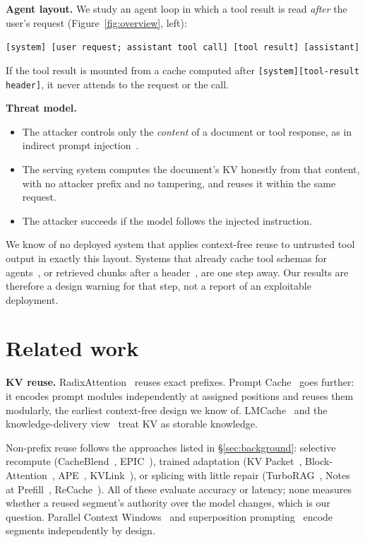 \documentclass[10pt]{article}
\begin{document}
\textbf{Agent layout.} We study an agent loop in which a tool result is read \emph{after} the user's request (Figure~\ref{fig:overview},
left):
\begin{center}\small\texttt{[system] [user request; assistant tool call] [tool result] [assistant]}\end{center}
If the tool result is mounted from a cache computed after \texttt{[system][tool-result header]}, it never attends to the request or
the call.

\textbf{Threat model.}
\begin{itemize}
\item The attacker controls only the \emph{content} of a document or tool response, as in indirect prompt
  injection~\citep{greshake2023indirect}.
\item The serving system computes the document's KV honestly from that content, with no attacker prefix and no tampering, and
  reuses it within the same request.
\item The attacker succeeds if the model follows the injected instruction.
\end{itemize}
We know of no deployed system that applies context-free reuse to untrusted tool output in exactly this layout. Systems that already
cache tool schemas for agents~\citep{fang2026recache}, or retrieved chunks after a
header~\citep{lu2025turborag,yao2025cacheblend}, are one step away. Our results are therefore a design warning for that step, not a
report of an exploitable deployment.

\section{Related work}\label{sec:related}
\textbf{KV reuse.} RadixAttention~\citep{zheng2024sglang} reuses exact prefixes. Prompt Cache~\citep{gim2024promptcache} goes
further: it encodes prompt modules independently at assigned positions and reuses them modularly, the earliest context-free design
we know of.
LMCache~\citep{liu2025lmcache} and the knowledge-delivery view~\citep{cheng2024kdn} treat KV as storable knowledge.

Non-prefix reuse follows the approaches listed in \S\ref{sec:background}: selective recompute (CacheBlend~\citep{yao2025cacheblend},
EPIC~\citep{hu2025epic}), trained adaptation (KV Packet~\citep{chen2026kvpacket}, Block-Attention~\citep{ma2025blockattention},
APE~\citep{yang2025ape}, KVLink~\citep{yang2025kvlink}), or splicing with little repair (TurboRAG~\citep{lu2025turborag}, Notes at
Prefill~\citep{li2026notes}, ReCache~\citep{fang2026recache}). All of these evaluate accuracy or latency; none measures whether a
reused segment's authority over the model changes, which is our question.
Parallel Context Windows~\citep{ratner2023pcw} and superposition prompting~\citep{merth2024superposition} encode segments
independently by design.
\end{document}
